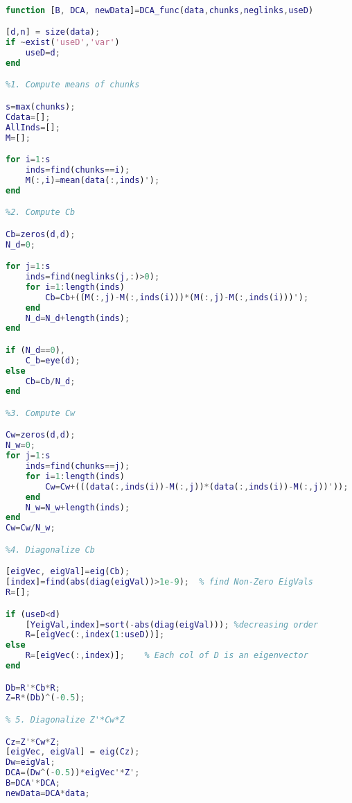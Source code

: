 \begin{lstlisting}[language={matlab}, caption={DCA算法}, label=code:dca]

function [B, DCA, newData]=DCA_func(data,chunks,neglinks,useD)

[d,n] = size(data);
if ~exist('useD','var')
    useD=d;
end

%1. Compute means of chunks

s=max(chunks);
Cdata=[];
AllInds=[];
M=[];

for i=1:s
    inds=find(chunks==i);
    M(:,i)=mean(data(:,inds)');    
end

%2. Compute Cb

Cb=zeros(d,d);
N_d=0;

for j=1:s
    inds=find(neglinks(j,:)>0);
    for i=1:length(inds)
        Cb=Cb+((M(:,j)-M(:,inds(i)))*(M(:,j)-M(:,inds(i)))');
    end
    N_d=N_d+length(inds);
end

if (N_d==0),
    C_b=eye(d);
else
    Cb=Cb/N_d;
end

%3. Compute Cw

Cw=zeros(d,d);
N_w=0;
for j=1:s
    inds=find(chunks==j);
    for i=1:length(inds)
        Cw=Cw+(((data(:,inds(i))-M(:,j))*(data(:,inds(i))-M(:,j))'));
    end
    N_w=N_w+length(inds);
end
Cw=Cw/N_w;

%4. Diagonalize Cb

[eigVec, eigVal]=eig(Cb);
[index]=find(abs(diag(eigVal))>1e-9);  % find Non-Zero EigVals 
R=[];

if (useD<d)
    [YeigVal,index]=sort(-abs(diag(eigVal))); %decreasing order
    R=[eigVec(:,index(1:useD))];
else
    R=[eigVec(:,index)];	% Each col of D is an eigenvector
end

Db=R'*Cb*R;
Z=R*(Db)^(-0.5);

% 5. Diagonalize Z'*Cw*Z

Cz=Z'*Cw*Z;
[eigVec, eigVal] = eig(Cz);
Dw=eigVal;
DCA=(Dw^(-0.5))*eigVec'*Z';
B=DCA'*DCA;
newData=DCA*data;
\end{lstlisting}

